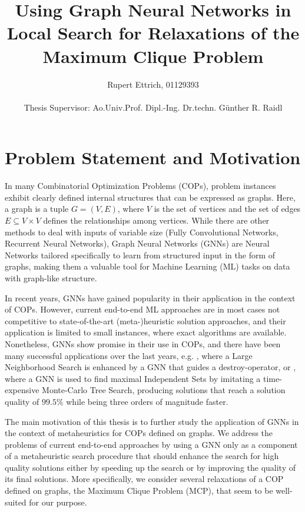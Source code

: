 \documentclass[11pt]{article}
\title{Using Graph Neural Networks in Local Search for Relaxations of the Maximum Clique Problem}
\author{Rupert Ettrich, 01129393 \\\\ Thesis Supervisor: Ao.Univ.Prof. Dipl.-Ing. Dr.techn. Günther R. Raidl}
\date{}
\begin{document}
	
\maketitle 
 
\section{Problem Statement and Motivation}

In many Combinatorial Optimization Problems (COPs), problem instances exhibit clearly defined internal structures that can be expressed as graphs. Here, a graph is a tuple $G = (V, E)$, where $V$ is the set of vertices and the set of edges $E \subseteq V \times V$ defines the relationships among vertices. While there are other methods to deal with inputs of variable size (Fully Convolutional Networks, Recurrent Neural Networks), Graph Neural Networks (GNNs) are Neural Networks tailored specifically to learn from structured input in the form of graphs, making them a valuable tool for Machine Learning (ML) tasks on data with graph-like structure.   

In recent years, GNNs have gained popularity in their application in the context of COPs. However, current end-to-end ML approaches are in most cases not competitive to state-of-the-art (meta-)heuristic solution approaches, and their application is limited to small instances, where exact algorithms are available. Nonetheless, GNNs show promise in their use in COPs, and there have been many successful applications over the last years, e.g. 
\cite{Oberweger2022}, where a Large Neighborhood Search is enhanced by a GNN that guides a destroy-operator, or \cite{NEURIPS2021_0db2e204}, where a GNN is used to find maximal Independent Sets by imitating a time-expensive Monte-Carlo Tree Search, producing solutions that reach a solution quality of $99.5\%$ while being three orders of magnitude faster. 

The main motivation of this thesis is to further study the application of GNNs in the context of metaheuristics for COPs defined on graphs. We address the problems of current end-to-end approaches by using a GNN only as a component of a metaheuristic search procedure that should enhance the search for high quality solutions either by speeding up the search or by improving the quality of its final solutions. More specifically, we consider several relaxations of a COP defined on graphs, the Maximum Clique Problem (MCP), that seem to be well-suited for our purpose. 
\end{document}
